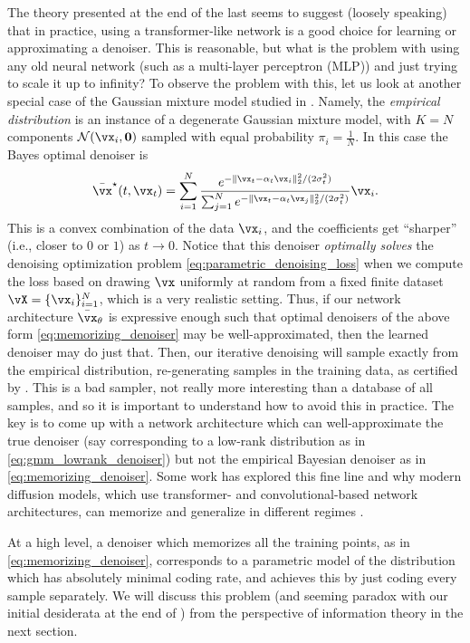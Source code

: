\documentclass[../../book-main.tex]{subfiles}
\begin{document}
\begin{remark}
	The theory presented at the end of the last  seems to suggest (loosely speaking) that in practice, using a transformer-like network is a good choice for learning or approximating a denoiser. This is reasonable, but what is the problem with using any old neural network (such as a multi-layer perceptron (MLP)) and just trying to scale it up to infinity? To observe the problem with this, let us look at another special case of the Gaussian mixture model studied in . Namely, the \textit{empirical distribution} is an instance of a degenerate Gaussian mixture model, with \(K = N\) components \(\dNorm(\vx_{i}, \vzero)\) sampled with equal probability \(\pi_{i} = \frac{1}{N}\). In this case the Bayes optimal denoiser is
	\begin{equation}\label{eq:memorizing_denoiser}
		\bar{\vx}^{\star}(t, \vx_{t}) = \sum_{i = 1}^{N}\frac{e^{-\|\vx_{t} - \alpha_{t}\vx_{i}\|_{2}^{2}/(2\sigma_{t}^{2})}}{\sum_{j = 1}^{N}e^{-\|\vx_{t} - \alpha_{t}\vx_{j}\|_{2}^{2}/(2\sigma_{t}^{2})}}\vx_{i}.
	\end{equation}
	This is a convex combination of the data \(\vx_{i}\), and the coefficients get ``sharper'' (i.e., closer to \(0\) or \(1\)) as \(t \to 0\). Notice that this denoiser \textit{optimally solves} the denoising optimization problem \eqref{eq:parametric_denoising_loss} when we compute the loss based on drawing \(\vx\) uniformly at random from a fixed finite dataset \(\vX = \{\vx_{i}\}_{i = 1}^{N}\), which is a very realistic setting. Thus, if our network architecture \(\bar{\vx}_{\theta}\) is expressive enough such that optimal denoisers of the above form \eqref{eq:memorizing_denoiser} may be well-approximated, then the learned denoiser may do just that. Then, our iterative denoising  will sample exactly from the empirical distribution, re-generating samples in the training data, as certified by . This is a bad sampler, not really more interesting than a database of all samples, and so it is important to understand how to avoid this in practice. The key is to come up with a network architecture which can well-approximate the true denoiser (say corresponding to a low-rank distribution as in \eqref{eq:gmm_lowrank_denoiser}) but not the empirical Bayesian denoiser as in \eqref{eq:memorizing_denoiser}. Some work has explored this fine line and why modern diffusion models, which use transformer- and convolutional-based network architectures, can memorize and generalize in different regimes \citep{kamb2024analytic,niedoba2024towards}.

	At a high level, a denoiser which memorizes all the training points, as in \eqref{eq:memorizing_denoiser}, corresponds to a parametric model of the distribution which has absolutely minimal coding rate, and achieves this by just coding every sample separately. We will discuss this problem (and seeming paradox with our initial desiderata at the end of ) from the perspective of information theory in the next section.
\end{remark}
\end{document}
